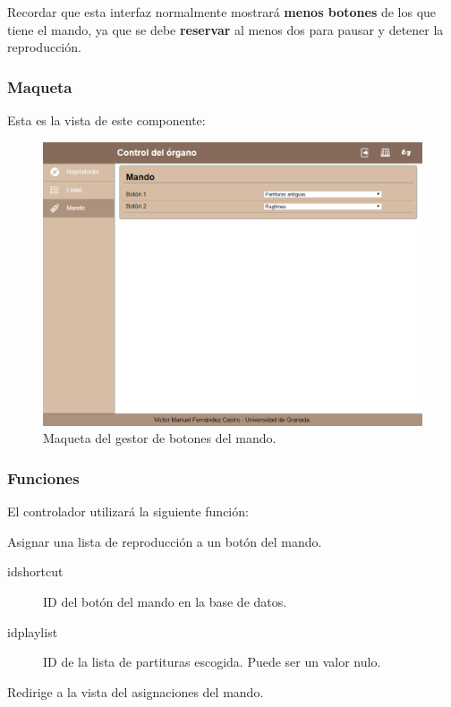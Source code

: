 Recordar que esta interfaz normalmente mostrará \textbf{menos botones} de los que tiene el mando, ya que se debe \textbf{reservar} al menos dos para pausar y detener la reproducción.

\subsubsection{Maqueta}

Esta es la vista de este componente:

\smallskip

\begin{figure}[H]
	\noindent \begin{centering}
		\includegraphics[width=\linewidth*3/4]{capitulo4/cap_mando}
		\par\end{centering}
	\smallskip
	\caption{\label{fig:cap_mando} Maqueta del gestor de botones del mando.}
\end{figure} 

\smallskip

\subsubsection{Funciones}

El controlador utilizará la siguiente función:

\begin{description}[style=nextline]
	\item[set\_shortcut (idshortcut, idplaylist)]
	Asignar una lista de reproducción a un botón del mando.
	
	\begin{description}
		\item[idshortcut] ID del botón del mando en la base de datos.
		\item[idplaylist] ID de la lista de partituras escogida. Puede ser un valor nulo.
	\end{description}
	
	Redirige a la vista del asignaciones del mando.
\end{description}

